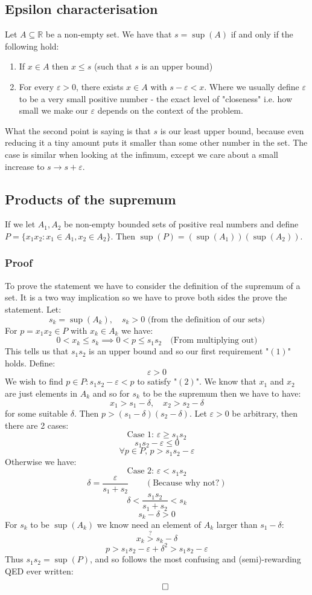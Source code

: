 \documentclass[12pt]{article}
\begin{document}
\subsection*{Epsilon characterisation}
Let \(A\subseteq\mathbb{R}\) be a non-empty set. We have that \(s=\sup(A)\) if and only if the following hold:
\begin{enumerate}
    \item If \(x\in A\) then \(x\leq s\) (such that \(s\) is an upper bound)
    \item For every \(\varepsilon>0\), there exists \(x\in A\) with \(s-\varepsilon<x\). Where we usually define \(\varepsilon\) to be a very small positive number - the exact level of "closeness" i.e. how small we make our \(\varepsilon\) depends on the context of the problem.
\end{enumerate}
What the second point is saying is that \(s\) is our least upper bound, because even reducing it a tiny amount puts it smaller than some other number in the set. The case is similar when looking at the infimum, except we care about a small increase to \(s\to s+\varepsilon\).
\subsection*{Products of the supremum}
If we let \(A_1,A_2\) be non-empty bounded sets of positive real numbers and define \(P=\{x_1x_2:x_1\in A_1,x_2\in A_2\}\). Then \(\sup(P)=(\sup(A_1))(\sup(A_2))\).
\subsubsection*{Proof}
To prove the statement we have to consider the definition of the supremum of a set. It is a two way implication so we have to prove both sides the prove the statement. Let:
\[s_k=\sup(A_k),\quad s_k>0\text{ (from the definition of our sets)}\]
For \(p=x_1x_2\in P\) with \(x_k\in A_k\) we have:
\[0<x_k\leq s_k\implies0<p\leq s_1s_2\quad\text{(From multiplying out)}\]
This tells us that \(s_1s_2\) is an upper bound and so our first requirement "\((1)\)" holds. Define:
\[\varepsilon>0\]
We wish to find \(p\in P:s_1s_2-\varepsilon<p\) to satisfy "\((2)\)". We know that \(x_1\) and \(x_2\) are just elements in \(A_k\) and so for \(s_k\) to be the supremum then we have to have:
\[x_1>s_1-\delta,\quad x_2>s_2-\delta\]
for some suitable \(\delta\). Then \(p>(s_1-\delta)(s_2-\delta)\). Let \(\varepsilon>0\) be arbitrary, then there are 2 cases:
\[\text{Case 1: }\varepsilon\geq s_1s_2\]
\[s_1s_2-\varepsilon\leq0\]
\[\forall p\in P,\,p>s_1s_2-\varepsilon\]
Otherwise we have:
\[\text{Case 2: }\varepsilon<s_1s_2\]
\[\delta=\frac{\varepsilon}{s_1+s_2}\qquad(\text{Because why not?})\]
\[\delta<\frac{s_1s_2}{s_1+s_2}<s_k\]
\[s_k-\delta>0\]
For \(s_k\) to be \(\sup(A_k)\) we know need an element of \(A_k\) larger than \(s_1-\delta\):
\[x_k\overset{?}{>}s_k-\delta\]
\[p>s_1s_2-\varepsilon+\delta^2>s_1s_2-\varepsilon\]
Thus \(s_1s_2=\sup(P)\), and so follows the most confusing and (semi)-rewarding QED ever written:
\[\qed\]
\end{document}
